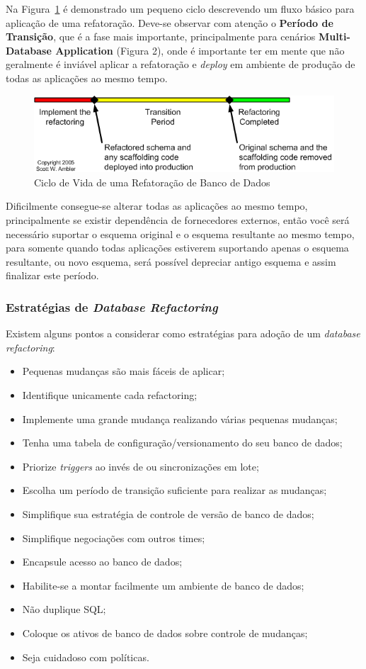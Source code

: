 \documentclass[10pt]{article}
\begin{document}
	Na Figura~\ref{figura:4} é demonstrado um pequeno ciclo descrevendo um fluxo básico para aplicação de uma refatoração. Deve-se observar com atenção o \textbf{Período de Transição}, que é a fase mais importante, principalmente para cenários \textbf{Multi-Database Application} (Figura 2), onde é importante ter em mente que não geralmente é inviável aplicar a refatoração e \textit{deploy} em ambiente de produção de todas as aplicações ao mesmo tempo. 

	\begin{figure}[ht]
		\centering
		\includegraphics[width=.5\textwidth]{img/databaseRefactoringLifecycle.png}
		\caption{Ciclo de Vida de uma Refatoração de Banco de Dados}
		\label{figura:4}
	\end{figure}

	Dificilmente consegue-se alterar todas as aplicações ao mesmo tempo, principalmente se existir dependência de fornecedores externos, então você será necessário suportar o esquema original e o esquema resultante ao mesmo tempo, para somente quando todas aplicações estiverem suportando apenas o esquema resultante, ou novo esquema, será possível depreciar antigo esquema e assim finalizar este período.

\subsubsection{Estratégias de \textit{Database Refactoring}}
	Existem alguns pontos a considerar como estratégias para adoção de um \textit{database refactoring}:
	\begin{itemize}
		\item Pequenas mudanças são mais fáceis de aplicar;
		\item Identifique unicamente cada refactoring;
		\item Implemente uma grande mudança realizando várias pequenas mudanças;
		\item Tenha uma tabela de configuração/versionamento do seu banco de dados;
		\item Priorize \textit{triggers} ao invés de  ou sincronizações em lote;
		\item Escolha um período de transição suficiente para realizar as mudanças;
		\item Simplifique sua estratégia de controle de versão de banco de dados;
		\item Simplifique negociações com outros times;
		\item Encapsule acesso ao banco de dados;
		\item Habilite-se a montar facilmente um ambiente de banco de dados;
		\item Não duplique SQL;
		\item Coloque os ativos de banco de dados sobre controle de mudanças;
		\item Seja cuidadoso com políticas.
	\end{itemize}
\end{document}
